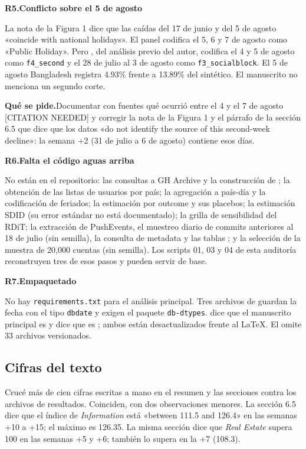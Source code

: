\documentclass[11pt,a4paper]{article}
\newcommand{\coment}[2]{\medskip\noindent\textbf{#1.\enspace #2}\par\nopagebreak}
\newcommand{\pide}{\par\noindent\textbf{Qué se pide.}\enspace}
\newcommand{\cod}[1]{\texttt{#1}}
\begin{document}
\coment{R5}{Conflicto sobre el 5 de agosto}
La nota de la Figura 1 dice que las caídas del 17 de junio y del 5 de agosto «coincide with national
holidays». El panel codifica el 5, 6 y 7 de agosto como «Public Holiday». Pero
, del análisis previo del autor, codifica el 4 y 5 de agosto
como \cod{f4\_second} y el 28 de julio al 3 de agosto como \cod{f3\_socialblock}. El 5 de agosto
Bangladesh registra 4.93\% frente a 13.89\% del sintético. El manuscrito no menciona un segundo corte.
\pide Documentar con fuentes qué ocurrió entre el 4 y el 7 de agosto [CITATION NEEDED] y corregir la
nota de la Figura 1 y el párrafo de la sección 6.5 que dice que los datos «do not identify the source
of this second-week decline»: la semana +2 (31 de julio a 6 de agosto) contiene esos días.

\coment{R6}{Falta el código aguas arriba}
No están en el repositorio: las consultas a GH Archive y la construcción de
; la obtención de las listas de usuarios por país; la agregación a
país-día y la codificación de feriados; la estimación por outcome y sus placebos; la estimación SDID
(su error estándar no está documentado); la grilla de sensibilidad del RDiT; la extracción de
PushEvents, el muestreo diario de commits anteriores al 18 de julio (sin semilla), la consulta de
metadata y las tablas ; y la selección de la muestra de 20,000 cuentas
(sin semilla). Los scripts 01, 03 y 04 de esta auditoría reconstruyen tres de esos pasos y pueden
servir de base.

\coment{R7}{Empaquetado}
No hay \cod{requirements.txt} para el análisis principal. Tres archivos de 
guardan la fecha con el tipo \cod{dbdate} y exigen el paquete \cod{db-dtypes}.  dice
que el manuscrito principal es  y  dice que es
; ambos están desactualizados frente al LaTeX. El  omite 33
archivos versionados.

\subsection{Cifras del texto}

Crucé más de cien cifras escritas a mano en el resumen y las secciones contra los archivos de resultados.
Coinciden, con dos observaciones menores. La sección 6.5 dice que el índice de \emph{Information} está
«between 111.5 and 126.4» en las semanas +10 a +15; el máximo es 126.35. La misma sección dice que
\emph{Real Estate} supera 100 en las semanas +5 y +6; también lo supera en la +7 (108.3).
\end{document}
